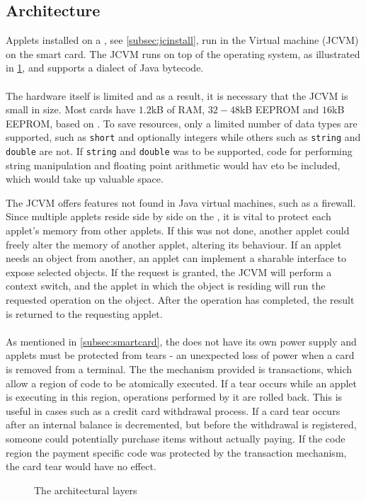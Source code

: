 \subsection{\jc Architecture}
Applets installed on a \jc, see \cref{subsec:jcinstall}, run in the \jc Virtual machine (JCVM) on the smart card. The JCVM runs on top of the operating system, as illustrated in \cref{fig:architecture},
and supports a dialect of Java bytecode.\\\\


The hardware itself is limited and as a result, it is necessary that the JCVM is small in size. Most cards have $1.2$kB of RAM, $32-48$kB EEPROM and $16$kB EEPROM, based on \cite[Sec. 2.1]{java_card_spec}. To save resources, only a limited number of data types are supported, such as \texttt{short} and optionally integers while others such as \texttt{string} and \texttt{double} are not. If \texttt{string} and \texttt{double} was to be supported, code for performing string manipulation and floating point arithmetic would hav eto be included, which would take up valuable space.

The JCVM offers features not found in Java virtual machines, such as a firewall. Since multiple applets reside side by side on the \jc, it is vital to protect each applet's memory from other applets. If this was not done, another applet could freely alter the memory of another applet, altering its behaviour. If an applet needs an object from another, an applet can implement a sharable interface to expose selected objects. If the request is granted, the JCVM will perform a context switch, and the applet in which the object is residing will run the requested operation on the object. After the operation has completed, the result is returned to the requesting applet.\\\\
As mentioned in \cref{subsec:smartcard}, the \jc does not have its own power supply and applets must be protected from tears - an unexpected loss of power when a card is removed from a terminal. The the mechanism provided is transactions, which allow a region of code to be atomically executed. If a tear occurs while an applet is executing in this region, operations performed by it are rolled back. This is useful in cases such as a credit card withdrawal process. If a card tear occurs after an internal balance is decremented, but before the withdrawal is registered, someone could potentially purchase items without actually paying. If the code region the payment specific code was protected by the transaction mechanism, the card tear would have no effect.



\begin{figure}[H]
\centering

\caption{The \jc architectural layers}
\label{fig:architecture}
\end{figure}